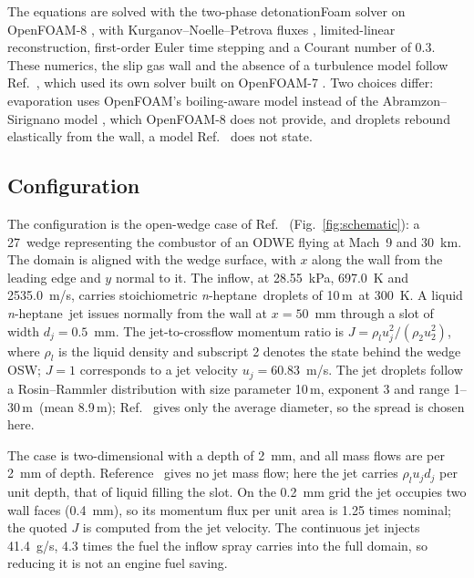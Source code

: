 \documentclass[aip,pof,preprint,amsmath,amssymb]{revtex4-2}
\newcommand{\um}{\,\textmu m}
\newcommand{\nh}{\textit{n}-heptane}
\begin{document}
The equations are solved with the two-phase detonationFoam solver \cite{Sun2023detonationfoam,detonationFoamSoftware} on OpenFOAM-8 \cite{Weller1998}, with Kurganov--Noelle--Petrova fluxes \cite{Kurganov2001}, limited-linear reconstruction, first-order Euler time stepping and a Courant number of 0.3. These numerics, the slip gas wall and the absence of a turbulence model follow Ref.~, which used its own solver built on OpenFOAM-7 \cite{Wang2024breakup}. Two choices differ: evaporation uses OpenFOAM's boiling-aware model instead of the Abramzon--Sirignano model \cite{Abramzon1989}, which OpenFOAM-8 does not provide, and droplets rebound elastically from the wall, a model Ref.~ does not state.

\subsection{Configuration}

The configuration is the open-wedge case of Ref.~ (Fig.~\ref{fig:schematic}): a 27\textdegree\ wedge representing the combustor of an ODWE flying at Mach~9 and 30~km. The domain is aligned with the wedge surface, with $x$ along the wall from the leading edge and $y$ normal to it. The inflow, at 28.55~kPa, 697.0~K and 2535.0~m/s, carries stoichiometric \nh\ droplets of 10\um\ at 300~K. A liquid \nh\ jet issues normally from the wall at $x = 50$~mm through a slot of width $d_j = 0.5$~mm. The jet-to-crossflow momentum ratio is $J = \rho_l u_j^2/(\rho_2 u_2^2)$, where $\rho_l$ is the liquid density and subscript 2 denotes the state behind the wedge OSW; $J = 1$ corresponds to a jet velocity $u_j = 60.83$~m/s. The jet droplets follow a Rosin--Rammler distribution \cite{Rosin1933} with size parameter 10\um, exponent 3 and range 1--30\um\ (mean 8.9\um); Ref.~ gives only the average diameter, so the spread is chosen here.

The case is two-dimensional with a depth of 2~mm, and all mass flows are per 2~mm of depth. Reference~ gives no jet mass flow; here the jet carries $\rho_l u_j d_j$ per unit depth, that of liquid filling the slot. On the 0.2~mm grid the jet occupies two wall faces (0.4~mm), so its momentum flux per unit area is 1.25 times nominal; the quoted $J$ is computed from the jet velocity. The continuous jet injects 41.4~g/s, 4.3 times the fuel the inflow spray carries into the full domain, so reducing it is not an engine fuel saving.
\end{document}
